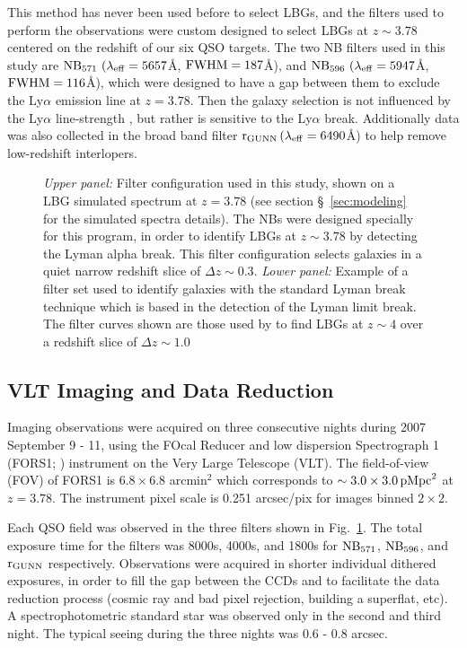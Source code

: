 \documentclass[iop, revtex4]{emulateapj}
\begin{document}
This method has never been used before to select LBGs, and the filters
used to perform the observations were custom designed
to select LBGs at $z\sim3.78$ centered on the redshift of our six QSO targets. 
The two NB
filters used in this study are $\rm NB_{571}~(\lambda_{eff}=5657$\AA,
$\rm FWHM=187$\AA), and $\rm NB_{596}~(\lambda_{eff}=5947$\AA, $\rm
FWHM=116$\AA), which were designed to have a gap between them to exclude the Ly$\alpha$
emission line at $z =3.78$. Then the galaxy selection is not influenced by the Ly$\alpha$ line-strength
, but rather is sensitive to the Ly$\alpha$ break. Additionally data was also collected in the broad band
filter $\rm r_{GUNN}\,(\lambda_{eff}=6490$\AA) to help remove low-redshift
interlopers.

\begin{figure}
\caption{\textit{Upper panel:} Filter configuration used in this study, shown on a LBG simulated spectrum at $z=3.78$ (see section \S~\ref{sec:modeling} for the simulated spectra details). The NBs were designed specially for this program, in order to identify LBGs at $z\sim3.78$ by detecting the Lyman alpha break. This filter configuration selects galaxies in a quiet narrow redshift slice of $\Delta z\sim0.3$. \textit{Lower panel:} Example of a filter set used to identify galaxies with the standard Lyman break technique which is based in the detection of the Lyman limit break. The filter curves shown are those used by \citet{Ouchi04a} to find LBGs at $z\sim4$ over a redshift slice of $\Delta z\sim1.0$\\}
\label{fig:filters}
\end{figure}

\subsection{VLT Imaging and Data Reduction}
\label{sec:obs}

Imaging observations were acquired on three consecutive nights during 2007 September 9 - 11,
using the FOcal Reducer and low dispersion Spectrograph 1 (FORS1; \citealt{Appenzeller92}) 
instrument on the Very Large Telescope (VLT). The field-of-view (FOV) of FORS1 is $6.8\times6.8$ arcmin$^{2}$ which corresponds to $\sim 3.0\times3.0\,{\rm pMpc}^{2}$ at $z=3.78$.
The instrument pixel scale is 0.251 arcsec/pix for images binned $2\times 2$. 

Each QSO field was observed in the three filters shown in Fig.~\ref{fig:filters}. The total exposure time for the filters was 8000s,
4000s, and 1800s for $\rm NB_{571}$, $\rm NB_{596}$, and $\rm r_{GUNN}$
respectively. Observations were acquired in shorter individual 
dithered exposures, in order to fill the gap between the CCDs
and to facilitate the data reduction process (cosmic ray and bad pixel
rejection, building a superflat, etc). A spectrophotometric
standard
star was observed only in the second and third night. The typical
seeing during the three nights was 0.6 - 0.8 arcsec.
\end{document}
